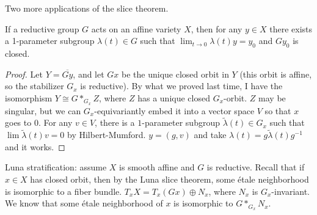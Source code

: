
Two more applications of the slice theorem.
\begin{lemma}
 If a reductive group $G$ acts on an affine variety $X$, then for any $y\in X$ there exists a 1-parameter subgroup $\lambda(t)\in G$ such that $\lim_{t\to 0} \lambda(t) y=y_0$ and $Gy_0$ is closed.
\end{lemma}
\begin{proof}
 Let $Y=\overline{Gy}$, and let $Gx$ be the unique closed orbit in $Y$ (this orbit is affine, so the stabilizer $G_x$ is reductive). By what we proved last time, I have the isomorphism $Y\cong G*_{G_x}Z$, where $Z$ has a unique closed $G_x$-orbit. $Z$ may be singular, but we can $G_x$-equivariantly embed it into a vector space $V$ so that $x$ goes to $0$. For any $v\in V$, there is a $1$-parameter subgroup $\tilde \lambda(t)\in G_x$ such that $\lim \tilde\lambda(t) v=0$ by Hilbert-Mumford. $y=(g,v)$ and take $\lambda(t)=g\tilde\lambda(t)g^{-1}$ and it works.
\end{proof}

Luna stratification: assume $X$ is smooth affine and $G$ is reductive. Recall that if $x\in X$ has closed orbit, then by the Luna slice theorem, some \'etale neighborhood is isomorphic to a fiber bundle. $T_xX=T_x (Gx)\oplus N_x$, where $N_x$ is $G_x$-invariant. We know that some \'etale neighborhood of $x$ is isomorphic to $G*_{G_x}N_x$.

